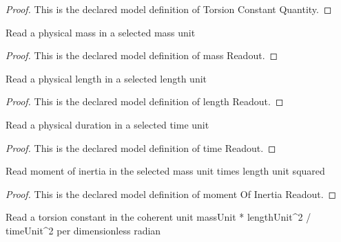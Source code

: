 \begin{proof}
  This is the declared model definition of Torsion Constant Quantity.
\end{proof}
\begin{definition}
  \label{def:physics:phyx-mini-0228:phyxminiproblems-problemphyxmini0228-massreadout}
  Read a physical mass in a selected mass unit
\end{definition}
\begin{proof}
  This is the declared model definition of mass Readout.
\end{proof}
\begin{definition}
  \label{def:physics:phyx-mini-0228:phyxminiproblems-problemphyxmini0228-lengthreadout}
  Read a physical length in a selected length unit
\end{definition}
\begin{proof}
  This is the declared model definition of length Readout.
\end{proof}
\begin{definition}
  \label{def:physics:phyx-mini-0228:phyxminiproblems-problemphyxmini0228-timereadout}
  Read a physical duration in a selected time unit
\end{definition}
\begin{proof}
  This is the declared model definition of time Readout.
\end{proof}
\begin{definition}
  \label{def:physics:phyx-mini-0228:phyxminiproblems-problemphyxmini0228-momentofinertiareadout}
  Read moment of inertia in the selected mass unit times length unit squared
\end{definition}
\begin{proof}
  This is the declared model definition of moment Of Inertia Readout.
\end{proof}
\begin{definition}
  \label{def:physics:phyx-mini-0228:phyxminiproblems-problemphyxmini0228-torsionconstantreadout}
  Read a torsion constant in the coherent unit massUnit * lengthUnit\textasciicircum{}2 / timeUnit\textasciicircum{}2 per dimensionless radian
\end{definition}
